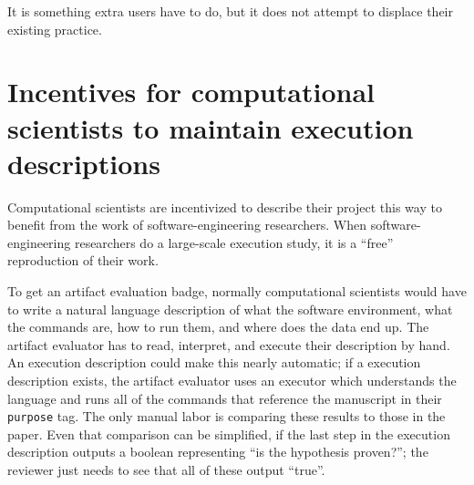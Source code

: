 \documentclass[natbib=false,manuscript,authordraft]{acmart}
\begin{document}
It is something extra users have to do, but it does not attempt to
displace their existing practice.

\hypertarget{incentives-for-computational-scientists-to-maintain-execution-descriptions}{%
\section{Incentives for computational scientists to maintain execution
descriptions}\label{incentives-for-computational-scientists-to-maintain-execution-descriptions}}

Computational scientists are incentivized to describe their project this
way to benefit from the work of software-engineering researchers. When
software-engineering researchers do a large-scale execution study, it is
a ``free'' reproduction of their work.

To get an artifact evaluation badge, normally computational scientists
would have to write a natural language description of what the software
environment, what the commands are, how to run them, and where does the
data end up. The artifact evaluator has to read, interpret, and execute
their description by hand. An execution description could make this
nearly automatic; if a execution description exists, the artifact
evaluator uses an executor which understands the language and runs all
of the commands that reference the manuscript in their \texttt{purpose}
tag. The only manual labor is comparing these results to those in the
paper. Even that comparison can be simplified, if the last step in the
execution description outputs a boolean representing ``is the hypothesis
proven?''; the reviewer just needs to see that all of these output
``true''.



\printbibliography
\end{document}

